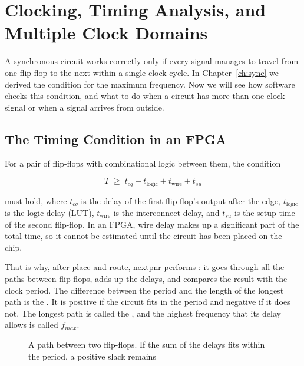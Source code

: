 \chapter{Clocking, Timing Analysis, and Multiple Clock Domains}
\label{ch:clocks}

A synchronous circuit works correctly only if every signal manages to travel
from one flip-flop to the next within a single clock cycle. In
Chapter~\ref{ch:sync} we derived the condition for the maximum frequency. Now
we will see how software checks this condition, and what to do when a circuit
has more than one clock signal or when a signal arrives from outside.

\section{The Timing Condition in an FPGA}

For a pair of flip-flops with combinational logic between them, the
condition

\[
T \;\ge\; t_{cq} + t_{\text{logic}} + t_{\text{wire}} + t_{su}
\]

must hold, where $t_{cq}$ is the delay of the first flip-flop's output after
the edge, $t_{\text{logic}}$ is the logic delay (LUT), $t_{\text{wire}}$ is the
interconnect delay, and $t_{su}$ is the setup time of the second flip-flop. In
an FPGA, wire delay makes up a significant part of the total time, so it
cannot be estimated until the circuit has been placed on the chip.

That is why, after place and route, nextpnr performs : it goes through all the paths between flip-flops, adds up the
delays, and compares the result with the clock period. The difference between
the period and the length of the longest path is the . It is
positive if the circuit fits in the period and negative if it does not. The
longest path is called the , and the highest frequency
that its delay allows is called $f_{max}$.

\begin{figure}[H]
\centering
{}
\caption{A path between two flip-flops. If the sum of the delays fits within the period, a positive slack remains}
\end{figure}

